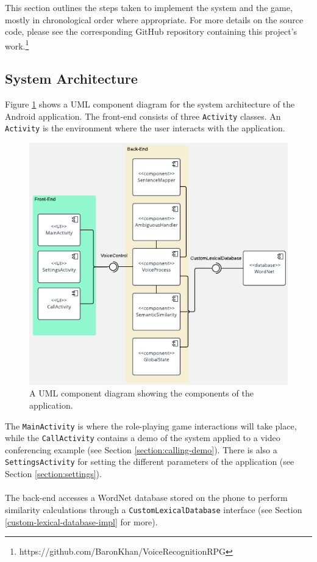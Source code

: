 \documentclass[11pt]{article}
\begin{document}
This section outlines the steps taken to implement the system and the game, mostly in chronological order where appropriate. For more details on the source code, please see the corresponding GitHub repository containing this project's work.\footnote{https://github.com/BaronKhan/VoiceRecognitionRPG}

\subsection{System Architecture}

Figure \ref{fig:component-diagram} shows a UML component diagram for the system architecture of the Android application. The front-end consists of three \texttt{Activity} classes. An \texttt{Activity} is the environment where the user interacts with the application.

\begin{figure}[H]
\begin{center}
  \includegraphics[width=\linewidth]{component-diagram.pdf}
  \caption{A UML component diagram showing the components of the application.}
  \label{fig:component-diagram}
  \end{center}
\end{figure}

The \texttt{MainActivity} is where the role-playing game interactions will take place, while the \texttt{CallActivity} contains a demo of the system applied to a video conferencing example (see Section \ref{section:calling-demo}). There is also a \texttt{SettingsActivity} for setting the different parameters of the application (see Section \ref{section:settings}).
\\
\\
The back-end accesses a WordNet database stored on the phone to perform similarity calculations through a \texttt{CustomLexicalDatabase} interface (see Section \ref{custom-lexical-database-impl} for more).
\end{document}
